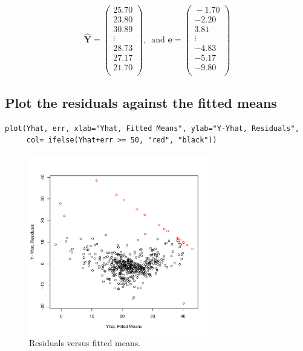 \documentclass[11pt]{article}
\begin{document}
\[
\mathbf{\hat{Y}} =
\begin{pmatrix}{}
  25.70 \\ 
  23.80 \\ 
  30.89 \\ 
  \vdots \\
  28.73 \\ 
  27.17 \\ 
  21.70 \\ 
  \end{pmatrix},\,\,\,\text{and}\,\,\mathbf{e} =
\begin{pmatrix}{}
  -1.70 \\ 
  -2.20 \\ 
  3.81 \\ 
   \vdots \\
  -4.83 \\ 
  -5.17 \\ 
  -9.80 \\ 
  \end{pmatrix}
\]
\subsection{Plot the residuals against the fitted means}
\label{sec-4-4}



\begin{verbatim}
plot(Yhat, err, xlab="Yhat, Fitted Means", ylab="Y-Yhat, Residuals", 
     col= ifelse(Yhat+err >= 50, "red", "black"))
\end{verbatim}

\begin{figure}[H]
\centering
\includegraphics[width=0.7\textwidth]{HW2_4d.pdf}
\caption{Residuals versus fitted means.}
\end{figure}
\end{document}
